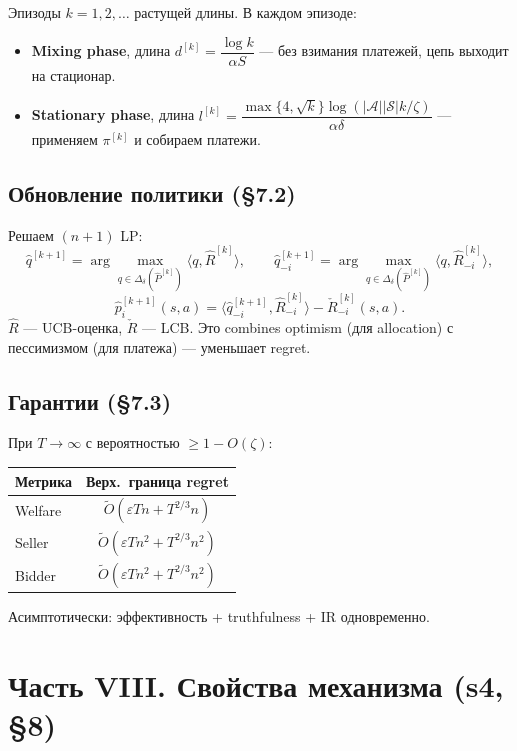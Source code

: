 \documentclass[11pt,a4paper]{article}
\begin{document}
Эпизоды $k=1,2,\ldots$ растущей длины. В каждом эпизоде:
\begin{itemize}
  \item \textbf{Mixing phase}, длина $d^{[k]}=\dfrac{\log k}{\alpha S}$ —
    без взимания платежей, цепь выходит на стационар.
  \item \textbf{Stationary phase}, длина
    $l^{[k]}=\dfrac{\max\{4,\sqrt{k}\}\log(|\mathcal{A}||\mathcal{S}|k/\zeta)}{\alpha\delta}$
    — применяем $\pi^{[k]}$ и собираем платежи.
\end{itemize}

\subsection{Обновление политики (§7.2)}

Решаем $(n+1)$ LP:
\[
\hat q^{[k+1]} = \arg\max_{q\in\Delta_\delta(\hat P^{[k]})}\langle q,\hat R^{[k]}\rangle,
\qquad
\hat q^{[k+1]}_{-i} = \arg\max_{q\in\Delta_\delta(\hat P^{[k]})}\langle q,\hat R^{[k]}_{-i}\rangle,
\]
\[
\hat p^{[k+1]}_i(s,a) = \langle \hat q^{[k+1]}_{-i}, \hat R^{[k]}_{-i}\rangle
- \check R^{[k]}_{-i}(s,a).
\]
$\hat R$ — UCB-оценка, $\check R$ — LCB. Это combines optimism
(для allocation) с пессимизмом (для платежа) — уменьшает regret.

\subsection{Гарантии (§7.3)}

При $T\to\infty$ с вероятностью $\geq 1-O(\zeta)$:
\begin{center}\small
\begin{tabular}{@{}lc@{}}
\toprule
Метрика & Верх.\ граница regret\\
\midrule
Welfare             & $\tilde O(\varepsilon T n + T^{2/3}n)$\\
Seller              & $\tilde O(\varepsilon T n^2 + T^{2/3}n^2)$\\
Bidder              & $\tilde O(\varepsilon T n^2 + T^{2/3}n^2)$\\
\bottomrule
\end{tabular}
\end{center}

Асимптотически: эффективность + truthfulness + IR одновременно.

\section{Часть VIII. Свойства механизма (s4, §8)}
\end{document}
